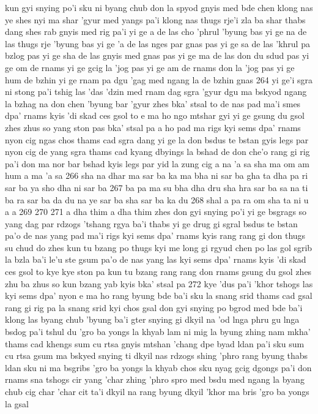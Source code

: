 kun gyi snying po'i sku ni byang chub don la spyod
gnyis med bde chen klong nas ye shes nyi ma shar
'gyur med yangs pa'i klong nas thugs rje'i zla ba shar
thabs dang shes rab gnyis med rig pa'i yi ge a
de las cho 'phrul 'byung bas yi ge na
de las thugs rje 'byung bas yi ge 'a
de las nges par gnas pas yi ge sa
de las 'khrul pa bzlog pas yi ge sha
de las gnyis med gnas pas yi ge ma
de las don du sdud pas yi ge om
de rnams yi ge gcig la 'jog pas yi ge am
de rnams don la 'jog pas yi ge hum
de bzhin yi ge rnam pa dgu
'gag med ngang la de bzhin gnas
264
yi ge'i sgra ni stong pa'i tshig las 'das
'dzin med rnam dag sgra 'gyur dgu
ma bskyod ngang la bzhag na don chen 'byung bar 'gyur
zhes bka' stsal to
de nas pad ma'i smes dpa' rnams kyis 'di skad ces gsol to
e ma ho
ngo mtshar gyi yi ge gsung du gsol
zhes zhus so
yang ston pas bka' stsal pa
a ho
pad ma rigs kyi sems dpa' rnams nyon cig
ngas chos thams cad sgra dang yi ge la don bsdus te bstan gyis legs par nyon cig
de yang sgra thams cad kyang dbyings la bshad de don che'o
rang gi rig pa'i don ma nor bar bshad kyis legs par yid la zung cig
a
na
'a
sa
sha
ma
om
am
hum
a
ma
'a
sa
266
sha
na
dhar ma
sar ba
ka ma
bha ni
sar ba
gha ta
dha pa ri
sar ba
ya sho
dha ni
sar ba
267
ba
pa ma
su bha
dha dru
sha hra
sar ba
sa na ti
ba ra
sar ba
da du na
ye
sar ba
sha
sar ba
ka du
268
shal
a pa ra
om sha ta ni
u
a
a
269
270
271
a dha thim a dha thim
zhes don gyi snying po'i yi ge bsgrags so
yang dag par rdzogs 'tshang rgya ba'i thabs yi ge drug gi sgral bsdus te bstan pa'o
de nas yang pad ma'i rigs kyi sems dpa' rnams kyis rang rang gi don thugs su chud do
zhes kun tu bzang po thugs kyi me long gi rgyud chen po las
gol sgrib la bzla ba'i le'u ste gsum pa'o
de nas yang las kyi sems dpa' rnams kyis 'di skad ces gsol to
kye kye ston pa kun tu bzang
rang rang don rnams gsung du gsol
zhes zhu ba zhus so
kun bzang yab kyis bka' stsal pa
272
kye 'dus pa'i 'khor tshogs las kyi sems dpa' nyon
e ma ho
rang byung bde ba'i sku la snang srid thams cad gsal
rang gi rig pa la snang srid kyi chos gsal
don gyi snying po bgrod med bde ba'i klong las byang chub 'byung ba'i gter
snying gi dkyil na 'od lnga phru gu lnga bsdog pa'i tshul du 'gro ba yongs la khyab
lam ni mig la byung zhing nam mkha' thams cad khengs
sum cu rtsa gnyis mtshan 'chang dpe byad ldan pa'i sku
sum cu rtsa gsum ma bskyed snying ti dkyil nas rdzogs shing 'phro
rang byung thabs ldan sku ni ma bsgribs 'gro ba yongs la khyab
chos sku
nyag gcig dgongs pa'i don rnams sna tshogs cir yang 'char zhing 'phro
spro med bsdu med ngang la byang chub cig char 'char
cit ta'i dkyil na rang byung dkyil 'khor ma bris 'gro ba yongs la gsal
